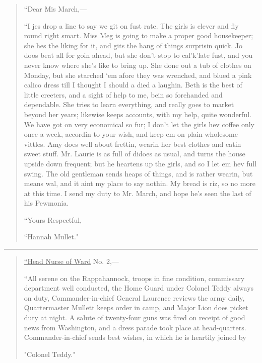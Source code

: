 \begin{quote}
``Dear Mis March,---

``I jes drop a line to say we git on fust rate. The girls is clever and
fly round right smart. Miss Meg is going to make a proper good
housekeeper; she hes the liking for it, and gits the hang of things
surprisin quick. Jo doos beat all for goin ahead, but she
don't stop to cal'k'late
fust, and you never know where she's like to bring up.
She done out a tub of clothes on Monday, but she starched
`em afore they was wrenched, and blued a pink calico
dress till I thought I should a died a laughin. Beth is the best of
little creeters, and a sight of help to me, bein so forehanded and
dependable. She tries to learn everything, and really goes to market
beyond her years; likewise keeps accounts, with my help, quite
wonderful. We have got on very economical so fur; I
don't let the girls hev coffee only once a week,
accordin to your wish, and keep em on plain wholesome vittles. Amy does
well about frettin, wearin her best clothes and eatin sweet stuff. Mr.
Laurie is as full of didoes as usual, and turns the house upside down
frequent; but he heartens up the girls, and so I let em hev full swing.
The old gentleman sends heaps of things, and is rather wearin, but means
wal, and it aint my place to say nothin. My bread is riz, so no more at
this time. I send my duty to Mr. March, and hope he's
seen the last of his Pewmonia.

{``Yours Respectful,}

``Hannah Mullet."
\end{quote}

\begin{center}\rule{0.5\linewidth}{0.5pt}\end{center}

\begin{quote}
\underline{``Head Nurse of Ward} No. 2,---

``All serene on the Rappahannock, troops in fine condition, commissary
department well conducted, the Home Guard under Colonel Teddy always on
duty, Commander-in-chief General Laurence reviews the army daily,
Quartermaster Mullett keeps order in camp, and Major Lion does picket
duty at night. A salute of twenty-four guns was fired on receipt of good
news from Washington, and a dress parade took place at head-quarters.
Commander-in-chief sends best wishes, in which he is heartily joined by

"{Colonel Teddy.}"
\end{quote}

